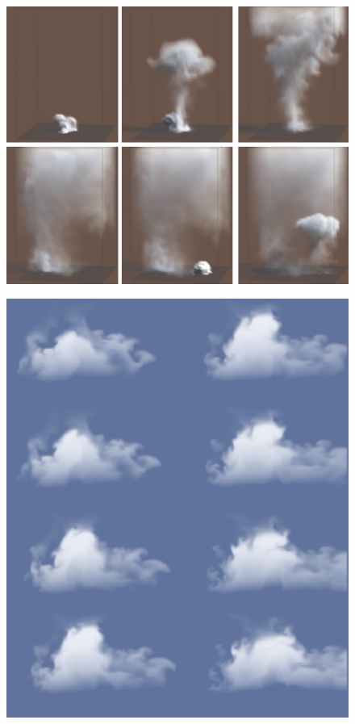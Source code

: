 \begin{figure}[ht!]
	\centering
	\includegraphics[width=\textwidth]{images/Visual_Simulation_of_Smoke.PNG}
	\caption{\citet*{Fedkiw01}}
	\label{fig:Visual_Simulation_of_Smoke}
\end{figure}
\begin{figure}[h!]
	\centering
	\includegraphics[width=\textwidth]{images/Simulation_of_Cloud_Dynamics_on_Graphics_Hardware.PNG}
	\caption{\citet{HarrisEtAl03}}
	\label{fig:Simulation_of_Cloud_Dynamics_on_Graphics_Hardware}
\end{figure}

